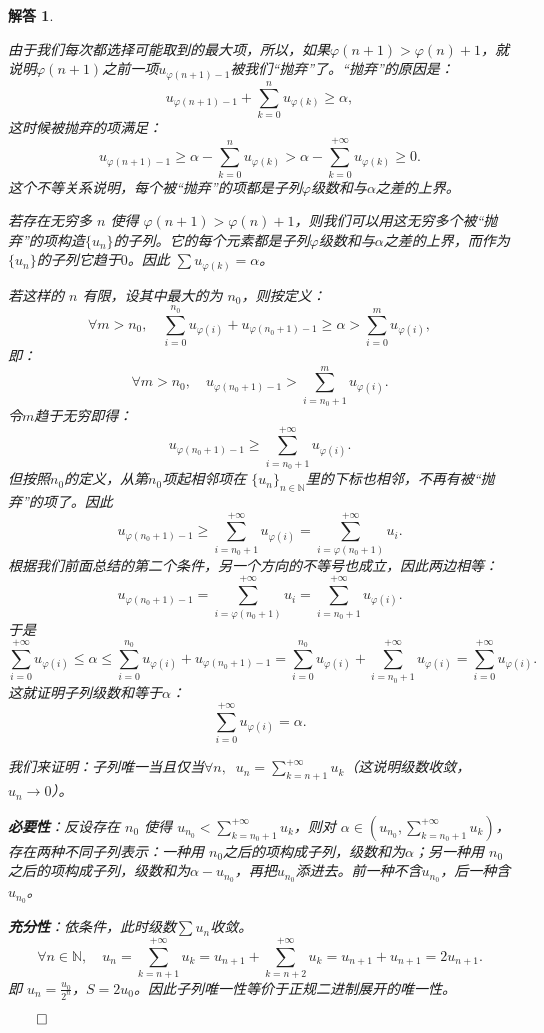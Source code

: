 \documentclass[12pt,UTF8]{ctexbook}
\theoremstyle{exercisestyle}
\theoremstyle{solutionstyle}
\newtheorem*{solution*}{解答}
\newenvironment{solution}
  {\begin{solution*}}
  {\hfill\ensuremath{\qed}\end{solution*}}
\begin{document}
\begin{solution}
\begin{subquestions}
由于我们每次都选择可能取到的最大项，所以，如果$\varphi(n+1) > \varphi(n)+1$，就说明$\varphi(n+1)$之前一项$u_{\varphi(n+1)-1}$被我们“抛弃”了。“抛弃”的原因是：
$$  u_{\varphi(n+1)-1} + \sum_{k=0}^n u_{\varphi(k)} \geqslant \alpha, $$
这时候被抛弃的项满足：
$$
u_{\varphi(n+1)-1} \geqslant \alpha - \sum_{k=0}^n u_{\varphi(k)} > \alpha - \sum_{k=0}^{+\infty} u_{\varphi(k)} \geqslant 0.
$$
这个不等关系说明，每个被“抛弃”的项都是子列$\varphi$级数和与$\alpha$之差的上界。

若存在无穷多 $n$ 使得 $\varphi(n+1) > \varphi(n)+1$，则我们可以用这无穷多个被“抛弃”的项构造$\{u_n\}$的子列。它的每个元素都是子列$\varphi$级数和与$\alpha$之差的上界，而作为$\{u_n\}$的子列它趋于$0$。因此 $\sum u_{\varphi(k)} = \alpha$。

若这样的 $n$ 有限，设其中最大的为 $n_0$，则按定义：
$$ \forall m > n_0, \quad \sum_{i=0}^{n_0} u_{\varphi(i)} + u_{\varphi(n_0+1) - 1} \geqslant \alpha > \sum_{i=0}^{m} u_{\varphi(i)} ,$$
即：
$$
\forall m > n_0, \quad u_{\varphi(n_0+1) - 1} > \sum_{i=n_0+1}^{m} u_{\varphi(i)}.
$$
令$m$趋于无穷即得：
$$
u_{\varphi(n_0+1) - 1} \geqslant \sum_{i=n_0+1}^{+\infty} u_{\varphi(i)}.
$$
但按照$n_0$的定义，从第$n_0$项起相邻项在 $\{u_n\}_{n\in\mathbb{N}}$里的下标也相邻，不再有被“抛弃”的项了。因此
$$
u_{\varphi(n_0+1) - 1} \geqslant \sum_{i=n_0+1}^{+\infty} u_{\varphi(i)} = \sum_{i=\varphi(n_0+1)}^{+\infty} u_{i}.
$$
根据我们前面总结的第二个条件，另一个方向的不等号也成立，因此两边相等：
$$
u_{\varphi(n_0+1) - 1} = \sum_{i=\varphi(n_0+1)}^{+\infty} u_{i} = \sum_{i=n_0+1}^{+\infty} u_{\varphi(i)}.
$$
于是
$$
\sum_{i=0}^{+\infty} u_{\varphi(i)}\leqslant \alpha \leqslant \sum_{i=0}^{n_0} u_{\varphi(i)} + u_{\varphi(n_0+1) - 1} = \sum_{i=0}^{n_0} u_{\varphi(i)} + \sum_{i=n_0+1}^{+\infty} u_{\varphi(i)} = \sum_{i=0}^{+\infty} u_{\varphi(i)}.
$$
这就证明子列级数和等于$\alpha$：
$$
\sum_{i=0}^{+\infty} u_{\varphi(i)} = \alpha.
$$

\item 我们来证明：子列唯一当且仅当$\forall n, \;\;\displaystyle u_n = \sum_{k=n+1}^{+\infty} u_k$（这说明级数收敛， $u_n \to 0$）。

\textbf{必要性}：反设存在 $n_0$ 使得 $u_{n_0} < \sum_{k=n_0+1}^{+\infty} u_k$，则对 $\alpha \in \left( u_{n_0}, \sum_{k=n_0+1}^{+\infty} u_k \right)$，存在两种不同子列表示：一种用 $n_0$之后的项构成子列，级数和为$\alpha $；另一种用 $n_0$之后的项构成子列，级数和为$\alpha - u_{n_0}$，再把$u_{n_0}$添进去。前一种不含$u_{n_0}$，后一种含$u_{n_0}$。

\textbf{充分性}：依条件，此时级数$\sum u_n$收敛。 
$$
\forall n\in \mathbb{N},\quad u_n = \sum_{k=n+1}^{+\infty} u_k = u_{n+1} + \sum_{k=n+2}^{+\infty} u_k = u_{n+1} + u_{n+1} = 2u_{n+1}.
$$
即 $\displaystyle u_n = \frac{u_0}{2^n}$，$S = 2u_0$。因此子列唯一性等价于正规二进制展开的唯一性。
\end{subquestions}
\end{solution}
\end{document}
